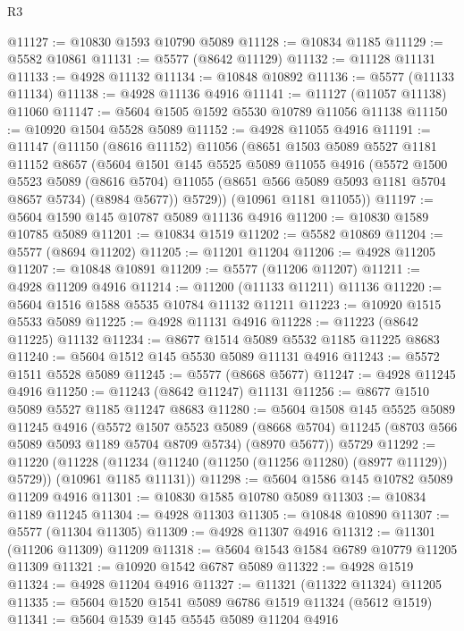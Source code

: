 \begin{lexlean}{R3}
\begin{coremodule}
@11127 := @10830 @1593 @10790 @5089
@11128 := @10834 @1185
@11129 := @5582 @10861
@11131 := @5577 (@8642 @11129)
@11132 := @11128 @11131
@11133 := @4928 @11132
@11134 := @10848 @10892
@11136 := @5577 (@11133 @11134)
@11138 := @4928 @11136 @4916
@11141 := @11127 (@11057 @11138) @11060
@11147 := @5604 @1505 @1592 @5530 @10789 @11056 @11138
@11150 := @10920 @1504 @5528 @5089
@11152 := @4928 @11055 @4916
@11191 := @11147
    (@11150
      (@8616 @11152)
      @11056
      (@8651
        @1503
        @5089
        @5527
        @1181
        @11152
        @8657
        (@5604
          @1501
          @145
          @5525
          @5089
          @11055
          @4916
          (@5572
            @1500
            @5523
            @5089
            (@8616 @5704)
            @11055
            (@8651 @566 @5089 @5093 @1181 @5704 @8657 @5734)
            (@8984 @5677))
          @5729))
      (@10961 @1181 @11055))
@11197 := @5604 @1590 @145 @10787 @5089 @11136 @4916
@11200 := @10830 @1589 @10785 @5089
@11201 := @10834 @1519
@11202 := @5582 @10869
@11204 := @5577 (@8694 @11202)
@11205 := @11201 @11204
@11206 := @4928 @11205
@11207 := @10848 @10891
@11209 := @5577 (@11206 @11207)
@11211 := @4928 @11209 @4916
@11214 := @11200 (@11133 @11211) @11136
@11220 := @5604 @1516 @1588 @5535 @10784 @11132 @11211
@11223 := @10920 @1515 @5533 @5089
@11225 := @4928 @11131 @4916
@11228 := @11223 (@8642 @11225) @11132
@11234 := @8677 @1514 @5089 @5532 @1185 @11225 @8683
@11240 := @5604 @1512 @145 @5530 @5089 @11131 @4916
@11243 := @5572 @1511 @5528 @5089
@11245 := @5577 (@8668 @5677)
@11247 := @4928 @11245 @4916
@11250 := @11243 (@8642 @11247) @11131
@11256 := @8677 @1510 @5089 @5527 @1185 @11247 @8683
@11280 := @5604
    @1508
    @145
    @5525
    @5089
    @11245
    @4916
    (@5572
      @1507
      @5523
      @5089
      (@8668 @5704)
      @11245
      (@8703 @566 @5089 @5093 @1189 @5704 @8709 @5734)
      (@8970 @5677))
    @5729
@11292 := @11220
    (@11228 (@11234 (@11240 (@11250 (@11256 @11280) (@8977 @11129)) @5729)) (@10961 @1185 @11131))
@11298 := @5604 @1586 @145 @10782 @5089 @11209 @4916
@11301 := @10830 @1585 @10780 @5089
@11303 := @10834 @1189 @11245
@11304 := @4928 @11303
@11305 := @10848 @10890
@11307 := @5577 (@11304 @11305)
@11309 := @4928 @11307 @4916
@11312 := @11301 (@11206 @11309) @11209
@11318 := @5604 @1543 @1584 @6789 @10779 @11205 @11309
@11321 := @10920 @1542 @6787 @5089
@11322 := @4928 @1519
@11324 := @4928 @11204 @4916
@11327 := @11321 (@11322 @11324) @11205
@11335 := @5604 @1520 @1541 @5089 @6786 @1519 @11324 (@5612 @1519)
@11341 := @5604 @1539 @145 @5545 @5089 @11204 @4916

\end{coremodule}
\end{lexlean}
